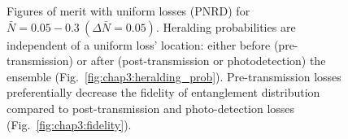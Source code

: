 \documentclass[aps,twocolumn,secnumarabic,amsmath,amssymb,pra,groupedaddress,
showpacs, showkeys]{revtex4-1}
\newcommand{\pna}[1]{\left(#1\right)}
\begin{document}
\begin{figure}[ht]
\centering
{}
\caption{\label{fig:chap3:pnrd_data}Figures of merit with uniform losses (PNRD) for $\bar{N}=0.05-0.3~\pna{\Delta\bar{N}=0.05}$. Heralding probabilities are independent of a uniform loss' location: either before (pre-transmission) or after (post-transmission or photodetection) the ensemble (Fig.~\ref{fig:chap3:heralding_prob}). Pre-transmission losses preferentially decrease the fidelity of entanglement distribution compared to post-transmission and photo-detection losses (Fig.~\ref{fig:chap3:fidelity}).}
\end{figure}
\end{document}
